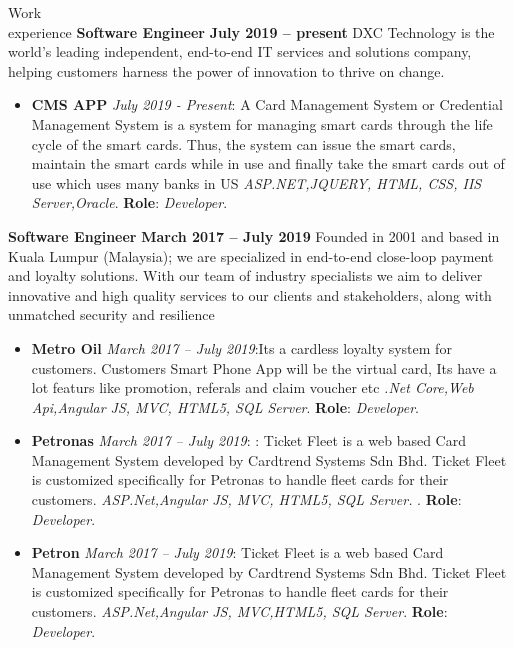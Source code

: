 \documentclass{resume}
\begin{document}
\begin{category}{Work \\experience}
  \citemnobullet \textbf{Software  Engineer} \hfill \textbf{July  2019 -- present}
  \citemnobullet DXC Technology is the world’s leading independent, end-to-end IT services and solutions company, helping customers harness the power of innovation to thrive on change.
  \begin{itemize}
  \item \textbf{CMS APP} {\em July 2019 - Present}: A Card Management System or Credential Management System is a system for managing smart cards through the life cycle of the smart cards. Thus, the system can issue the smart cards, maintain the smart cards while in use and finally take the smart cards out of use which uses many banks in US {\em ASP.NET,JQUERY, HTML, CSS, IIS Server,Oracle}. \textbf{Role}: {\em Developer}. 
  \end{itemize}
  \citemnobullet \textbf{Software Engineer} \hfill \textbf{March 2017 – July 2019}
  \citemnobullet Founded in 2001 and based in Kuala Lumpur (Malaysia); we are specialized in end-to-end close-loop payment and loyalty solutions. With our team of industry specialists we aim to deliver innovative and high quality services to our clients and stakeholders, along with unmatched security and resilience
  \begin{itemize}
  \item \textbf{Metro Oil} {\em March 2017 – July 2019}:Its a cardless loyalty system for customers. Customers Smart Phone App will be the virtual card, Its have a lot featurs like promotion, referals and claim voucher etc {\em  .Net Core,Web Api,Angular JS, MVC, HTML5, SQL Server}. \textbf{Role}: {\em Developer}. 
  \item \textbf{Petronas} {\em March 2017 – July 2019}: : Ticket Fleet is a web based Card Management System
developed by Cardtrend Systems Sdn Bhd. Ticket Fleet is customized specifically
for Petronas to handle fleet cards for their customers. {\em ASP.Net,Angular JS, MVC, HTML5, SQL Server. }. \textbf{Role}: {\em Developer}. 
  \item \textbf{Petron} {\em March 2017 – July 2019}: Ticket Fleet is a web based Card Management System developed by Cardtrend Systems Sdn Bhd. Ticket Fleet is customized specifically for Petronas to handle fleet cards for their customers. {\em ASP.Net,Angular JS, MVC,HTML5, SQL Server}. \textbf{Role}: {\em Developer}. 

\end{itemize}
\end{category}
\end{document}
